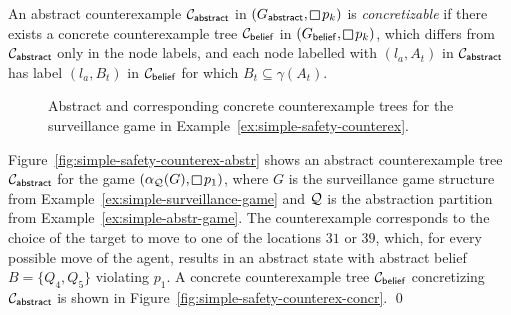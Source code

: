 An abstract counterexample $\mathcal{C}_{\mathsf{abstract}}$ in $(G_\abstr,\LTLglobally p_k)$ is \emph{concretizable} if there exists a concrete counterexample 
tree $\mathcal{C}_{\mathsf{belief}}$ in $(G_\belief,\LTLglobally p_k)$, which differs from $\mathcal{C}_{\mathsf{abstract}}$ only in the node labels, and each node labelled with $(l_a,A_t)$ in $\mathcal{C}_{\mathsf{abstract}}$ has label $(l_a, B_t)$ in $\mathcal{C}_{\mathsf{belief}}$ for which $B_t \subseteq \gamma(A_t)$.


\begin{figure}
\hfill
{}
\caption{Abstract and corresponding concrete counterexample trees for the surveillance game in Example~\ref{ex:simple-safety-counterex}.}
\label{fig:simple-safety-counterex}
\end{figure}

\begin{example}\label{ex:simple-safety-counterex}
Figure~\ref{fig:simple-safety-counterex-abstr} shows an abstract counterexample tree $\mathcal{C}_{\mathsf{abstract}}$ for the game $(\alpha_\part(G),\LTLglobally p_1)$, where $G$ is the surveillance game structure from Example~\ref{ex:simple-surveillance-game} and $\mathcal{Q}$ is the abstraction partition from Example~\ref{ex:simple-abstr-game}. The counterexample corresponds to the choice of the target to move to one of the locations $31$ or $39$, which, for every possible move of the agent, results in an abstract state with abstract belief $B = \{Q_4,Q_5\}$ violating $p_1$.
A concrete counterexample tree $\mathcal{C}_{\mathsf{belief}}$ concretizing $\mathcal{C}_{\mathsf{abstract}}$ is shown in Figure~\ref{fig:simple-safety-counterex-concr}.
\qed
\end{example}
